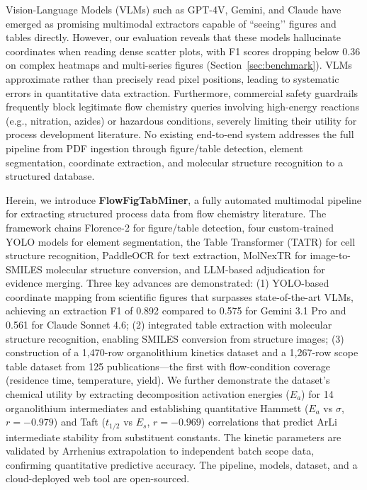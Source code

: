 \documentclass[journal=jcisd8,manuscript=article]{achemso}
\begin{document}
Vision-Language Models (VLMs) such as GPT-4V, Gemini, and Claude have emerged as promising multimodal extractors capable of ``seeing’’ figures and tables directly.\cite{openai2024gpt4technicalreport,google2025gemini25flashlite}
However, our evaluation reveals that these models hallucinate coordinates when reading dense scatter plots, with F1 scores dropping below 0.36 on complex heatmaps and multi-series figures (Section~\ref{sec:benchmark}).
VLMs approximate rather than precisely read pixel positions, leading to systematic errors in quantitative data extraction.
Furthermore, commercial safety guardrails frequently block legitimate flow chemistry queries involving high-energy reactions (e.g., nitration, azides) or hazardous conditions, severely limiting their utility for process development literature.\cite{röttger2024xstesttestsuiteidentifying}
No existing end-to-end system addresses the full pipeline from PDF ingestion through figure/table detection, element segmentation, coordinate extraction, and molecular structure recognition to a structured database.

Herein, we introduce \textbf{FlowFigTabMiner}, a fully automated multimodal pipeline for extracting structured process data from flow chemistry literature.
The framework chains Florence-2 for figure/table detection, four custom-trained YOLO models for element segmentation, the Table Transformer (TATR) for cell structure recognition, PaddleOCR for text extraction, MolNexTR for image-to-SMILES molecular structure conversion, and LLM-based adjudication for evidence merging.
Three key advances are demonstrated:
(1) YOLO-based coordinate mapping from scientific figures that surpasses state-of-the-art VLMs, achieving an extraction F1 of 0.892 compared to 0.575 for Gemini 3.1 Pro and 0.561 for Claude Sonnet 4.6;
(2) integrated table extraction with molecular structure recognition, enabling SMILES conversion from structure images;
(3) construction of a 1{,}470-row organolithium kinetics dataset and a 1{,}267-row scope table dataset from 125 publications---the first with flow-condition coverage (residence time, temperature, yield).
We further demonstrate the dataset’s chemical utility by extracting decomposition activation energies ($E_a$) for 14 organolithium intermediates and establishing quantitative Hammett ($E_a$ vs $\sigma$, $r = -0.979$) and Taft ($t_{1/2}$ vs $E_s$, $r = -0.969$) correlations that predict ArLi intermediate stability from substituent constants.
The kinetic parameters are validated by Arrhenius extrapolation to independent batch scope data, confirming quantitative predictive accuracy.
The pipeline, models, dataset, and a cloud-deployed web tool are open-sourced.
\end{document}
